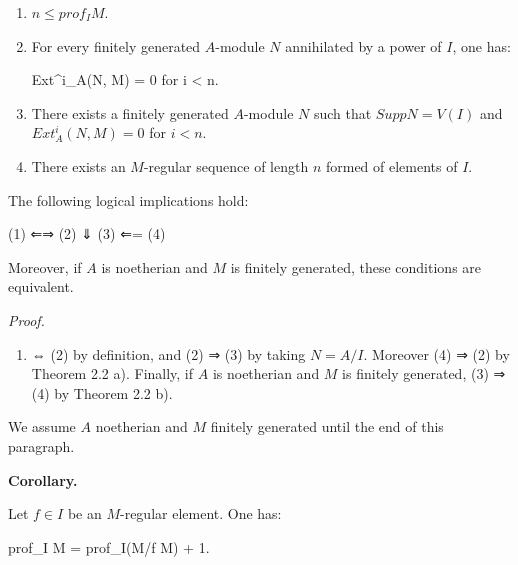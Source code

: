 \documentclass[
  11pt,
  a4paper,
]{book}
\newenvironment{Shaded}{}{}
\newcommand{\NormalTok}[1]{#1}
\providecommand{\tightlist}{%
  \setlength{\itemsep}{0pt}\setlength{\parskip}{0pt}}
\begin{document}
\begin{enumerate}
\def\labelenumi{\arabic{enumi}.}
\item
  \(n \leqslant prof_{I} M\).
\item
  For every finitely generated \(A\)-module \(N\) annihilated by a power
  of \(I\), one has:

\begin{Shaded}
\begin{Highlighting}[]
\NormalTok{Ext\^{}i\_A(N, M) = 0 for i \textless{} n.}
\end{Highlighting}
\end{Shaded}
\item
  There exists a finitely generated \(A\)-module \(N\) such that
  \(Supp N = V(I)\) and \(Ext^{i}_{A}(N, M) = 0\) for \(i < n\).
\item
  There exists an \(M\)-regular sequence of length \(n\) formed of
  elements of \(I\).
\end{enumerate}

The following logical implications hold:

\begin{Shaded}
\begin{Highlighting}[]
\NormalTok{(1) ⇐⇒ (2)}
\NormalTok{        ⇓}
\NormalTok{       (3) ⇐= (4)}
\end{Highlighting}
\end{Shaded}

Moreover, if \(A\) is noetherian and \(M\) is finitely generated, these
conditions are equivalent.

\emph{Proof.}

\begin{enumerate}
\def\labelenumi{(\arabic{enumi})}
\tightlist
\item
  ⇔ (2) by definition, and (2) ⇒ (3) by taking \(N = A/I\). Moreover (4)
  ⇒ (2) by Theorem 2.2 a). Finally, if \(A\) is noetherian and \(M\) is
  finitely generated, (3) ⇒ (4) by Theorem 2.2 b).
\end{enumerate}

We assume \(A\) noetherian and \(M\) finitely generated until the end of
this paragraph.

\textbf{Corollary.}

Let \(f \in I\) be an \(M\)-regular element. One has:

\begin{Shaded}
\begin{Highlighting}[]
\NormalTok{prof\_I M = prof\_I(M/f M) + 1.}
\end{Highlighting}
\end{Shaded}
\end{document}

